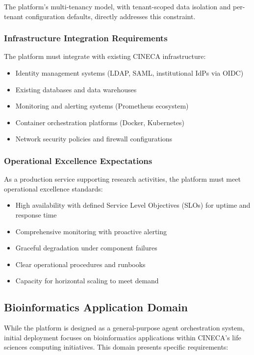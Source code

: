 \documentclass[a4paper,twoside]{sapthesis}
\begin{document}
The platform's multi-tenancy model, with tenant-scoped data isolation and per-tenant configuration defaults, directly addresses this constraint.

\subsubsection{Infrastructure Integration Requirements}

The platform must integrate with existing CINECA infrastructure:

\begin{itemize}
    \item Identity management systems (LDAP, SAML, institutional IdPs via OIDC)
    \item Existing databases and data warehouses
    \item Monitoring and alerting systems (Prometheus ecosystem)
    \item Container orchestration platforms (Docker, Kubernetes)
    \item Network security policies and firewall configurations
\end{itemize}

\subsubsection{Operational Excellence Expectations}

As a production service supporting research activities, the platform must meet operational excellence standards:

\begin{itemize}
    \item High availability with defined Service Level Objectives (SLOs) for uptime and response time
    \item Comprehensive monitoring with proactive alerting
    \item Graceful degradation under component failures
    \item Clear operational procedures and runbooks
    \item Capacity for horizontal scaling to meet demand
\end{itemize}

\subsection{Bioinformatics Application Domain}

While the platform is designed as a general-purpose agent orchestration system, initial deployment focuses on bioinformatics applications within CINECA's life sciences computing initiatives. This domain presents specific requirements:
\end{document}
